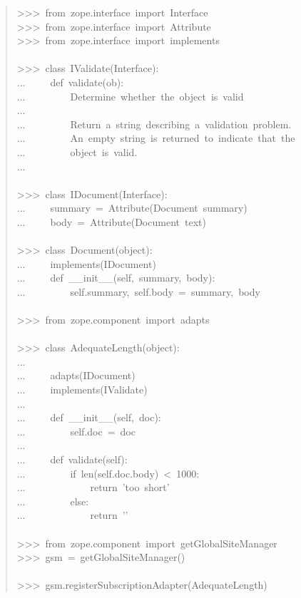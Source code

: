 \documentclass[14pt,a4paper,openany,twoside,final]{extbook}
\begin{document}
\begin{quote}{\ttfamily \raggedright \noindent
>{}>{}>~from~zope.interface~import~Interface\\
>{}>{}>~from~zope.interface~import~Attribute\\
>{}>{}>~from~zope.interface~import~implements\\
~\\
>{}>{}>~class~IValidate(Interface):\\
...~~~~~def~validate(ob):\\
...~~~~~~~~~\textquotedbl{}\textquotedbl{}\textquotedbl{}Determine~whether~the~object~is~valid\\
...\\
...~~~~~~~~~Return~a~string~describing~a~validation~problem.\\
...~~~~~~~~~An~empty~string~is~returned~to~indicate~that~the\\
...~~~~~~~~~object~is~valid.\\
...~~~~~~~~~\textquotedbl{}\textquotedbl{}\textquotedbl{}\\
~\\
>{}>{}>~class~IDocument(Interface):\\
...~~~~~summary~=~Attribute(\textquotedbl{}Document~summary\textquotedbl{})\\
...~~~~~body~=~Attribute(\textquotedbl{}Document~text\textquotedbl{})\\
~\\
>{}>{}>~class~Document(object):\\
...~~~~~implements(IDocument)\\
...~~~~~def~\_\_init\_\_(self,~summary,~body):\\
...~~~~~~~~~self.summary,~self.body~=~summary,~body\\
~\\
>{}>{}>~from~zope.component~import~adapts\\
~\\
>{}>{}>~class~AdequateLength(object):\\
...\\
...~~~~~adapts(IDocument)\\
...~~~~~implements(IValidate)\\
...\\
...~~~~~def~\_\_init\_\_(self,~doc):\\
...~~~~~~~~~self.doc~=~doc\\
...\\
...~~~~~def~validate(self):\\
...~~~~~~~~~if~len(self.doc.body)~<~1000:\\
...~~~~~~~~~~~~~return~'too~short'\\
...~~~~~~~~~else:\\
...~~~~~~~~~~~~~return~'{}'\\
~\\
>{}>{}>~from~zope.component~import~getGlobalSiteManager\\
>{}>{}>~gsm~=~getGlobalSiteManager()\\
~\\
>{}>{}>~gsm.registerSubscriptionAdapter(AdequateLength)
}
\end{quote}
\end{document}
